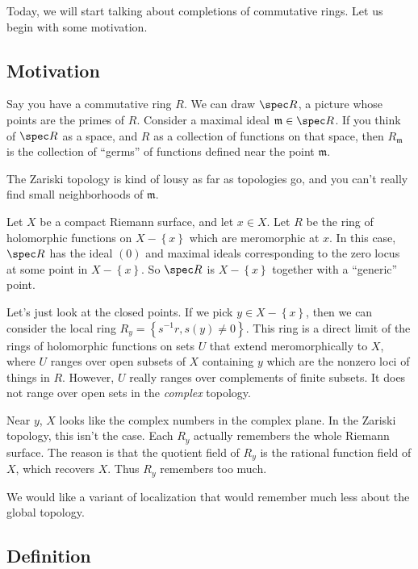 Today, we will start talking about completions of commutative rings. Let us
begin with some motivation.

\subsection{Motivation}
Say you have a commutative ring $R$. We can draw $\spec R$, a picture whose
points are the primes of $R$. Consider a maximal ideal $\mathfrak{m} \in \spec
R$. If you think of $\spec R$ as a space, and $R$ as a collection of functions
on that space, then $R_{\mathfrak{m}}$ is the collection of ``germs'' of
functions defined near the point $\mathfrak{m}$. 

The Zariski topology is kind of lousy as far as topologies go, and you can't
really find small neighborhoods of $\mathfrak{m}$.

\begin{example} 
Let $X$ be a compact Riemann surface, and let $x \in X$. Let $R$ be the ring of
holomorphic functions on $X - \left\{x\right\}$ which are meromorphic at $x$.
In this case, $\spec R$ has the ideal $(0)$ and maximal ideals corresponding to
the zero locus at some point in $X - \left\{x\right\}$. So $\spec R$ is $X -
\left\{x\right\}$ together with a ``generic'' point.

Let's just look at the closed points.  If we pick $y \in X - \left\{x\right\}$,
then we can consider the local ring $R_y = \left\{s^{-1}r, s(y) \neq
0\right\}$. This ring is a direct limit of the rings of holomorphic functions
on sets $U$ that extend meromorphically to $X$, where $U$ ranges over open
subsets of $X$ containing $y$ which are the nonzero loci of things in $R$. However, $U$ really ranges over complements of
finite subsets. It does not range over open sets in the \emph{complex} topology.

Near $y$, $X$ looks like the complex numbers in the complex plane. In the Zariski topology, this
isn't the case. Each $R_y$ actually remembers the whole Riemann surface. The
reason is that the quotient field of $R_y$ is the rational function field of
$X$, which recovers $X$. Thus $R_y$ remembers too much. 
\end{example} 

We would like a variant of localization that would remember much less about the
global topology.

\subsection{Definition}


